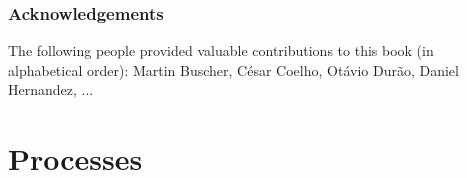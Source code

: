 \documentclass[11pt,fleqn]{book} %
\begin{document}

\section*{Acknowledgements}

The following people provided valuable contributions to this book (in alphabetical order):
Martin Buscher, César Coelho, Otávio Durão, Daniel Hernandez, ...





\pagestyle{empty} %

\tableofcontents %

\clearpage %

\pagestyle{fancy} %


\setlength{\parskip}{0.6em}
\setlength{\parindent}{0pt}



\part{Processes}
\label{part:processes}








\end{document}
